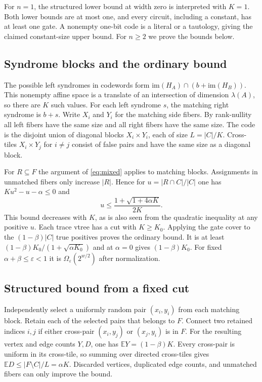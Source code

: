 \documentclass[11pt,a4paper]{amsart}
\newcommand{\E}{\mathbb E}
\begin{document}
For $n=1$, the structured lower bound at width zero is interpreted with $K=1$. Both lower bounds are at most one, and every circuit, including a constant, has at least one gate. A nonempty one-bit code is a literal or a tautology, giving the claimed constant-size upper bound. For $n\geq2$ we prove the bounds below.

\subsection{Syndrome blocks and the ordinary bound}
The possible left syndromes in codewords form $\mathrm{im}(H_A)\cap(b+\mathrm{im}(H_B))$. This nonempty affine space is a translate of an intersection of dimension $\lambda(A)$, so there are $K$ such values. For each left syndrome $s$, the matching right syndrome is $b+s$. Write $X_i$ and $Y_i$ for the matching side fibers. By rank-nullity all left fibers have the same size and all right fibers have the same size. The code is the disjoint union of diagonal blocks $X_i\times Y_i$, each of size $L=|C|/K$. Cross-tiles $X_i\times Y_j$ for $i\neq j$ consist of false pairs and have the same size as a diagonal block.

For $R\subseteq F$ the argument of \eqref{eq:mixed} applies to matching blocks. Assignments in unmatched fibers only increase $|R|$. Hence for $u=|R\cap C|/|C|$ one has $Ku^2-u-\alpha\leq0$ and
\[
                     u\leq\frac{1+\sqrt{1+4\alpha K}}{2K}.
\]
This bound decreases with $K$, as is also seen from the quadratic inequality at any positive $u$. Each trace vtree has a cut with $K\geq K_0$. Applying the gate cover to the $(1-\beta)|C|$ true positives proves the ordinary bound. It is at least $(1-\beta)K_0/(1+\sqrt{\alpha K_0})$ and at $\alpha=0$ gives $(1-\beta)K_0$. For fixed $\alpha+\beta\leq\varepsilon<1$ it is $\Omega_{\varepsilon}(2^{w/2})$ after normalization.

\subsection{Structured bound from a fixed cut}
Independently select a uniformly random pair $(x_i,y_i)$ from each matching block. Retain each of the selected pairs that belongs to $F$. Connect two retained indices $i,j$ if either cross-pair $(x_i,y_j)$ or $(x_j,y_i)$ is in $F$. For the resulting vertex and edge counts $Y,D$, one has $\E Y=(1-\beta)K$. Every cross-pair is uniform in its cross-tile, so summing over directed cross-tiles gives $\E D\leq |F\setminus C|/L=\alpha K$. Discarded vertices, duplicated edge counts, and unmatched fibers can only improve the bound.
\end{document}
